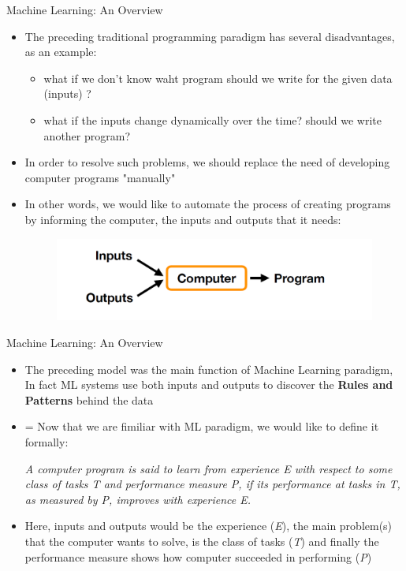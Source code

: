 \documentclass[compress,oilve]{beamer}
\begin{document}
\begin{frame}{Machine Learning: An Overview}
\begin{itemize}
\item The preceding traditional programming paradigm has several disadvantages, as an example:
	\begin{itemize}
	\item what if we don't know waht program should we write for the given data (inputs) ?
	\item what if the inputs change dynamically over the time? should we write another program? 
	\end{itemize}
\item In order to resolve such problems, we should replace the need of developing computer programs "manually"
\item In other words, we would like to automate the process of creating programs by informing the computer, the inputs and outputs that it needs:
\begin{figure}
\center \includegraphics[scale=0.5]{2}
\end{figure}
\end{itemize}
\end{frame}

\begin{frame}{Machine Learning: An Overview}
\begin{itemize}
\item The preceding model was the main function of Machine Learning paradigm, In fact ML systems use both inputs and outputs to discover the \textbf{Rules and Patterns} behind the data 
\item= Now that we are fimiliar with ML paradigm, we would like to define it formally:
\begin{center}\textit{A computer program is said to learn from experience E with respect to some
class of tasks T and performance measure P, if its performance at tasks in T, as
measured by P, improves with experience E.}
\end{center}
\item Here, inputs and outputs would be the experience (\textit{E}), the main problem(s) that the computer wants to solve, is the class of tasks (\textit{T}) and finally the performance measure shows how computer succeeded in performing (\textit{P})
\end{itemize}
\end{frame}
\end{document}
